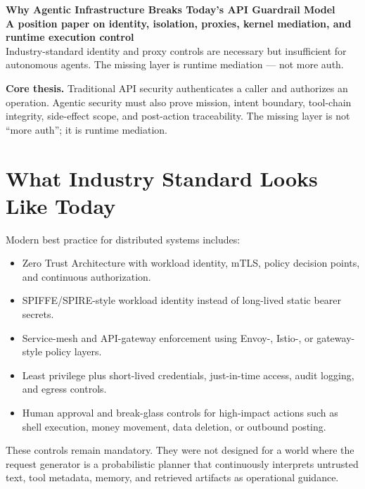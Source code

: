 \documentclass[10pt]{article}
\date{}
\newcommand{\muted}[1]{\textcolor{textmuted}{#1}}
\begin{document}
\thispagestyle{empty}

{\fontsize{19}{22}\selectfont\bfseries\color{navy} Why Agentic Infrastructure Breaks Today's API Guardrail Model}\\[0.22em]
{\fontsize{11.5}{14}\selectfont\bfseries A position paper on identity, isolation, proxies, kernel mediation, and runtime execution control}\\[0.35em]
{\small\muted{Industry-standard identity and proxy controls are necessary but insufficient for autonomous agents. The missing layer is runtime mediation --- not more auth.}}

\vspace{0.3em}
\noindent{\color{rule}\rule{\linewidth}{0.7pt}}

\vspace{0.4em}
\noindent\colorbox{warnbg}{\parbox{\dimexpr\linewidth-2\fboxsep\relax}{%
\textbf{Core thesis.} Traditional API security authenticates a caller and authorizes an operation. Agentic security must also prove mission, intent boundary, tool-chain integrity, side-effect scope, and post-action traceability. The missing layer is not ``more auth''; it is runtime mediation.}}

\section{What Industry Standard Looks Like Today}
Modern best practice for distributed systems includes:
\begin{itemize}
  \item Zero Trust Architecture with workload identity, mTLS, policy decision points, and continuous authorization.
  \item SPIFFE/SPIRE-style workload identity instead of long-lived static bearer secrets.
  \item Service-mesh and API-gateway enforcement using Envoy-, Istio-, or gateway-style policy layers.
  \item Least privilege plus short-lived credentials, just-in-time access, audit logging, and egress controls.
  \item Human approval and break-glass controls for high-impact actions such as shell execution, money movement, data deletion, or outbound posting.
\end{itemize}

These controls remain mandatory. They were not designed for a world where the request generator is a probabilistic planner that continuously interprets untrusted text, tool metadata, memory, and retrieved artifacts as operational guidance.
\end{document}
